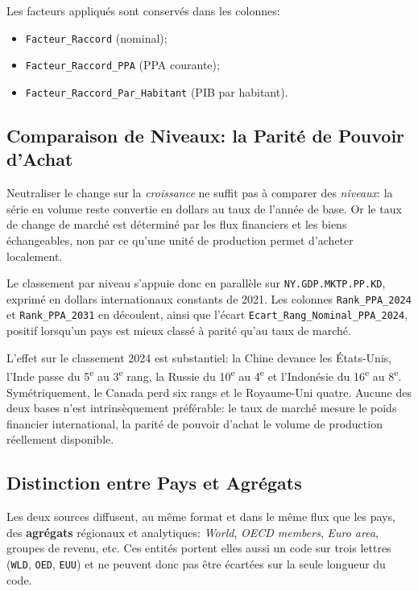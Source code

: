 \documentclass[11pt,a4paper]{article}
\begin{document}
Les facteurs appliqués sont conservés dans les colonnes:
\begin{itemize}
    \item \texttt{Facteur\_Raccord} (nominal);
    \item \texttt{Facteur\_Raccord\_PPA} (PPA courante);
    \item \texttt{Facteur\_Raccord\_Par\_Habitant} (PIB par habitant).
\end{itemize}

\subsection{Comparaison de Niveaux: la Parité de Pouvoir d'Achat}
Neutraliser le change sur la \emph{croissance} ne suffit pas à comparer des \emph{niveaux}: la série en volume reste convertie en dollars au taux de l'année de base. Or le taux de change de marché est déterminé par les flux financiers et les biens échangeables, non par ce qu'une unité de production permet d'acheter localement.

Le classement par niveau s'appuie donc en parallèle sur \texttt{NY.GDP.MKTP.PP.KD}, exprimé en dollars internationaux constants de 2021. Les colonnes \texttt{Rank\_PPA\_2024} et \texttt{Rank\_PPA\_2031} en découlent, ainsi que l'écart \texttt{Ecart\_Rang\_Nominal\_PPA\_2024}, positif lorsqu'un pays est mieux classé à parité qu'au taux de marché.

L'effet sur le classement 2024 est substantiel: la Chine devance les États-Unis, l'Inde passe du 5\textsuperscript{e} au 3\textsuperscript{e} rang, la Russie du 10\textsuperscript{e} au 4\textsuperscript{e} et l'Indonésie du 16\textsuperscript{e} au 8\textsuperscript{e}. Symétriquement, le Canada perd six rangs et le Royaume-Uni quatre. Aucune des deux bases n'est intrinsèquement préférable: le taux de marché mesure le poids financier international, la parité de pouvoir d'achat le volume de production réellement disponible.

\subsection{Distinction entre Pays et Agrégats}
Les deux sources diffusent, au même format et dans le même flux que les pays, des \textbf{agrégats} régionaux et analytiques: \textit{World}, \textit{OECD members}, \textit{Euro area}, groupes de revenu, etc. Ces entités portent elles aussi un code sur trois lettres (\texttt{WLD}, \texttt{OED}, \texttt{EUU}) et ne peuvent donc pas être écartées sur la seule longueur du code.
\end{document}

